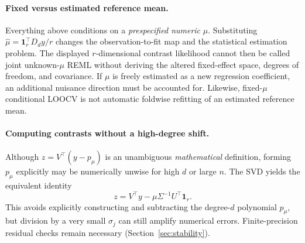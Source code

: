 \paragraph{Fixed versus estimated reference mean.}
Everything above conditions on a
\emph{prespecified numeric} $\mu$.
Substituting
$\widehat\mu=\mathbf1_r^\top D_dy/r$
changes the observation-to-fit map
and the statistical estimation problem.
The displayed $r$-dimensional contrast
likelihood cannot then be called
joint unknown-$\mu$ REML without
deriving the altered fixed-effect
space, degrees of freedom, and covariance.
If $\mu$ is freely estimated as a
new regression coefficient, an additional
nuisance direction must be accounted for.
Likewise, fixed-$\mu$ conditional
LOOCV is not automatic foldwise refitting
of an estimated reference mean.

\paragraph{Computing contrasts without a high-degree shift.}
Although $z=V^\top(y-p_\mu)$ is an
unambiguous \emph{mathematical} definition,
forming $p_\mu$ explicitly may be numerically
unwise for high $d$ or large $n$.
The SVD yields the equivalent identity
\begin{equation}\label{eq:contrast-shiftfree}
z=V^\top y-\mu\Sigma^{-1}
U^\top\mathbf1_r.
\end{equation}
This avoids explicitly constructing
and subtracting the degree-$d$
polynomial $p_\mu$, but division by
a very small $\sigma_j$ can still
amplify numerical errors. Finite-precision
residual checks remain necessary
(Section~\ref{sec:stability}).
